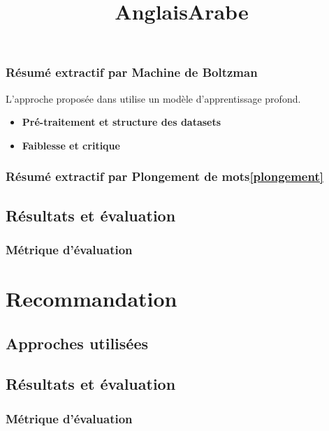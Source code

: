         \subsubsection{Résumé extractif par Machine de Boltzman}
            L'approche proposée dans \cite{boltzman} utilise un modèle d'apprentissage profond.   
            \begin{itemize}
                \item{\textbf{Pré-traitement et structure des datasets}}
                \item{\textbf{Faiblesse et critique}}
            \end{itemize}
        \subsubsection{Résumé extractif par Plongement de mots\ref{plongement}}
    \subsection{Résultats et évaluation}
        \subsubsection{Métrique d'évaluation}
        \title{Anglais}
        \title{Arabe}

\section{Recommandation}
    \subsection{Approches utilisées}    
    \subsection{Résultats et évaluation}
        \subsubsection{Métrique d'évaluation}